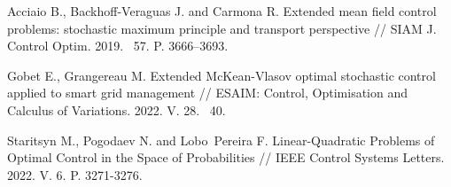 \begin{thebibliography}{9} %

 Acciaio B., Backhoff-Veraguas J. and Carmona  R. Extended mean field control problems: stochastic maximum principle and transport perspective // SIAM J. Control Optim. 2019. \textnumero~57. P. 3666--3693.

 Gobet E., Grangereau M. Extended McKean-Vlasov optimal stochastic control applied
to smart grid management // ESAIM: Control, Optimisation and Calculus of Variations. 2022. V. 28. \textnumero~40.

 Staritsyn M., Pogodaev N. and Lobo~Pereira F. Linear-Quadratic Problems of Optimal Control in the Space of Probabilities // IEEE Control Systems Letters. 2022. V. 6. P. 3271-3276.






\end{thebibliography}





%

